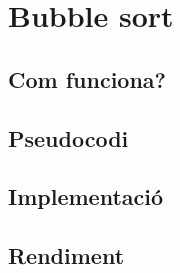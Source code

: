 \chapter{Bubble sort}

\section{Com funciona?}
\section{Pseudocodi}
\section{Implementació}

\section{Rendiment}
